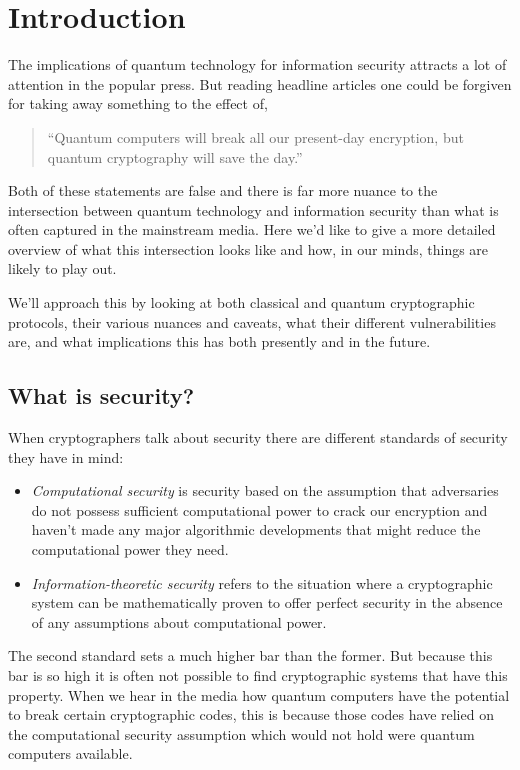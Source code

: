 \section{Introduction} \label{introduction}

The implications of quantum technology for information security attracts a lot of attention in the popular press. But reading headline articles one could be forgiven for taking away something to the effect of,
\begin{quote}
	``Quantum computers will break all our present-day encryption, but quantum cryptography will save the day.''
\end{quote}
Both of these statements are false and there is far more nuance to the intersection between quantum technology and information security than what is often captured in the mainstream media. Here we'd like to give a more detailed overview of what this intersection looks like and how, in our minds, things are likely to play out.

We'll approach this by looking at both classical and quantum cryptographic protocols, their various nuances and caveats, what their different vulnerabilities are, and what implications this has both presently and in the future.

\subsection{What is security?} \label{what-is-security}

When cryptographers talk about security there are different standards of security they have in mind:
\begin{itemize}
	\item \emph{Computational security} is security based on the assumption that adversaries do not possess sufficient computational power to crack our encryption and haven't made any major algorithmic developments that might reduce the computational power they need.
	\item \emph{Information-theoretic security} refers to the situation where a cryptographic system can be mathematically proven to offer perfect security in the absence of any assumptions about computational power.
\end{itemize}

The second standard sets a much higher bar than the former. But because this bar is so high it is often not possible to find cryptographic systems that have this property. When we hear in the media how quantum computers have the potential to break certain cryptographic codes, this is because those codes have relied on the computational security assumption which would not hold were quantum computers available.

